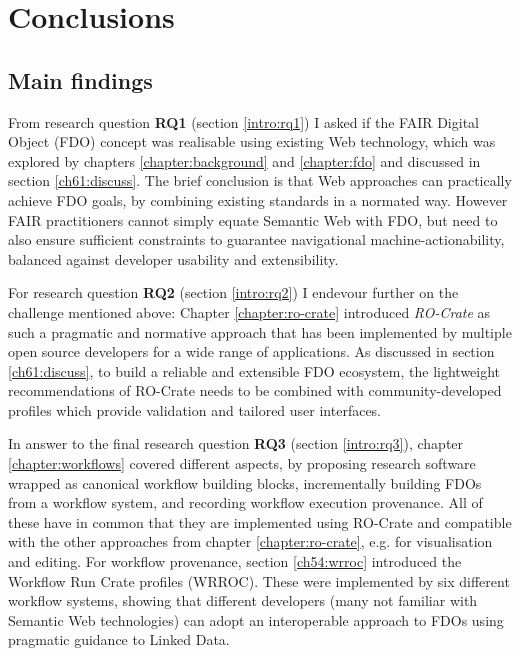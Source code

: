 \section{Conclusions}

\subsection{Main findings}

From research question \textbf{RQ1} (section \vref{intro:rq1}) I asked if the FAIR Digital Object (FDO) concept was realisable using existing Web technology, which was explored by chapters \ref{chapter:background} and \ref{chapter:fdo} and discussed in section \ref{ch61:discuss}. The brief conclusion is that Web approaches can practically achieve FDO goals, by combining existing standards in a normated way. However FAIR practitioners cannot simply equate Semantic Web with FDO, but need to also ensure sufficient constraints to guarantee navigational machine-actionability, balanced against developer usability and extensibility. 

For research question \textbf{RQ2} (section \vref{intro:rq2}) I endevour further on the challenge mentioned above: Chapter \ref{chapter:ro-crate} introduced \emph{RO-Crate} as such a pragmatic and normative approach that has been implemented by multiple open source developers for a wide range of applications. As discussed in section \ref{ch61:discuss}, to build a reliable and extensible FDO ecosystem, the lightweight recommendations of RO-Crate needs to be combined with community-developed profiles which provide validation and tailored user interfaces.

In answer to the final research question \textbf{RQ3} (section \vref{intro:rq3}), chapter \ref{chapter:workflows} covered different aspects, by proposing research software wrapped as canonical workflow building blocks, incrementally building FDOs from a workflow system, and recording workflow execution provenance. All of these have in common that they are implemented using RO-Crate and compatible with the other approaches from chapter \ref{chapter:ro-crate}, e.g. for visualisation and editing. For workflow provenance, section \vref{ch54:wrroc} introduced the Workflow Run Crate profiles (WRROC). These were implemented by six different workflow systems, showing that different developers (many not familiar with Semantic Web technologies) can adopt an interoperable approach to FDOs using pragmatic guidance to Linked Data. 


